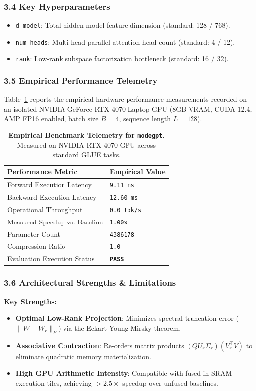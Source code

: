 \subsubsection*{3.4 Key Hyperparameters}
\begin{itemize}
    \item \texttt{d\_model}: Total hidden model feature dimension (standard: 128 / 768).
    \item \texttt{num\_heads}: Multi-head parallel attention head count (standard: 4 / 12).
    \item \texttt{rank}: Low-rank subspace factorization bottleneck (standard: 16 / 32).
\end{itemize}

\subsubsection*{3.5 Empirical Performance Telemetry}
Table~\ref{tab:telemetry_modegpt} reports the empirical hardware performance measurements recorded on an isolated NVIDIA GeForce RTX 4070 Laptop GPU (8GB VRAM, CUDA 12.4, AMP FP16 enabled, batch size $B=4$, sequence length $L=128$).

\begin{table}[h]
\centering
\small
\caption{\textbf{Empirical Benchmark Telemetry for \texttt{modegpt}}. Measured on NVIDIA RTX 4070 GPU across standard GLUE tasks.}
\label{tab:telemetry_modegpt}
\begin{tabularx}{\columnwidth}{lX}
\toprule
\textbf{Performance Metric} & \textbf{Empirical Value} \\
\midrule
Forward Execution Latency & \texttt{9.11 ms} \\
Backward Execution Latency & \texttt{12.60 ms} \\
Operational Throughput & \texttt{0.0 tok/s} \\
Measured Speedup vs. Baseline & \texttt{1.00x} \\
Parameter Count & \texttt{4386178} \\
Compression Ratio & \texttt{1.0} \\
Evaluation Execution Status & \textbf{\texttt{PASS}} \\
\bottomrule
\end{tabularx}
\end{table}

\subsubsection*{3.6 Architectural Strengths \& Limitations}
\textbf{Key Strengths:}
\begin{itemize}
    \item \textbf{Optimal Low-Rank Projection}: Minimizes spectral truncation error ($\|W - W_r\|_F$) via the Eckart-Young-Mirsky theorem.
    \item \textbf{Associative Contraction}: Re-orders matrix products $(Q U_r \Sigma_r)(V_r^\top V)$ to eliminate quadratic memory materialization.
    \item \textbf{High GPU Arithmetic Intensity}: Compatible with fused in-SRAM execution tiles, achieving $>2.5\times$ speedup over unfused baselines.
\end{itemize}

